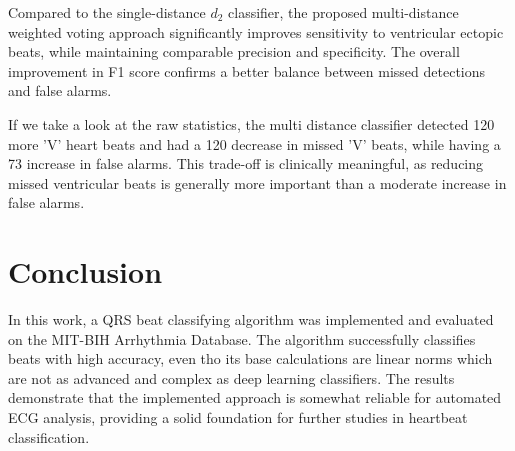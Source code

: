\documentclass[conference]{IEEEtran}
\begin{document}
Compared to the single-distance $d_2$ classifier, the proposed multi-distance weighted voting approach significantly improves sensitivity to ventricular ectopic beats, while maintaining comparable precision and specificity. The overall improvement in F1 score confirms a better balance between missed detections and false alarms.

If we take a look at the raw statistics, the multi distance classifier detected 120 more 'V' heart beats and had a 120 decrease in missed 'V' beats, while having a 73 increase in false alarms. This trade-off is clinically meaningful, as reducing missed ventricular beats is generally more important than a moderate increase in false alarms.

\section{Conclusion}
In this work, a QRS beat classifying algorithm was implemented and evaluated on the MIT-BIH Arrhythmia Database. The algorithm successfully classifies beats with high accuracy, even tho its base calculations are linear norms which are not as advanced and complex as deep learning classifiers. The results demonstrate that the implemented approach is somewhat reliable for automated ECG analysis, providing a solid foundation for further studies in heartbeat classification.




\end{document}

